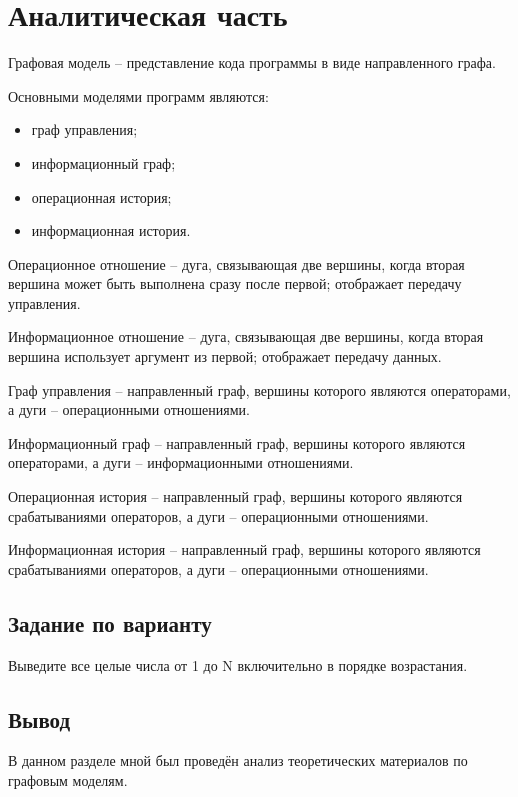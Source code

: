 \chapter{Аналитическая часть}
Графовая модель -- представление кода программы в виде направленного графа.~\cite{lit1}

Основными моделями программ являются:
\begin{itemize}
	\item граф управления;
	\item информационный граф;
	\item операционная история;
	\item информационная история.
\end{itemize}
\text{}

Операционное отношение -- дуга, связывающая две вершины, когда вторая вершина может быть выполнена сразу после первой; отображает передачу управления. 

Информационное отношение -- дуга, связывающая две вершины, когда вторая вершина использует аргумент из первой; отображает передачу данных. 

Граф управления -- направленный граф, вершины которого являются операторами, а дуги -- операционными отношениями. 
 
Информационный граф -- направленный граф, вершины которого являются операторами, а дуги -- информационными отношениями. 

Операционная история -- направленный граф, вершины которого являются срабатываниями операторов, а дуги -- операционными отношениями.

Информационная история -- направленный граф, вершины которого являются срабатываниями операторов, а дуги -- операционными отношениями.

\section{Задание по варианту}

Выведите все целые числа от 1 до N включительно в порядке возрастания.

\section*{Вывод}

В данном разделе мной был проведён анализ теоретических материалов по графовым моделям.

\clearpage
